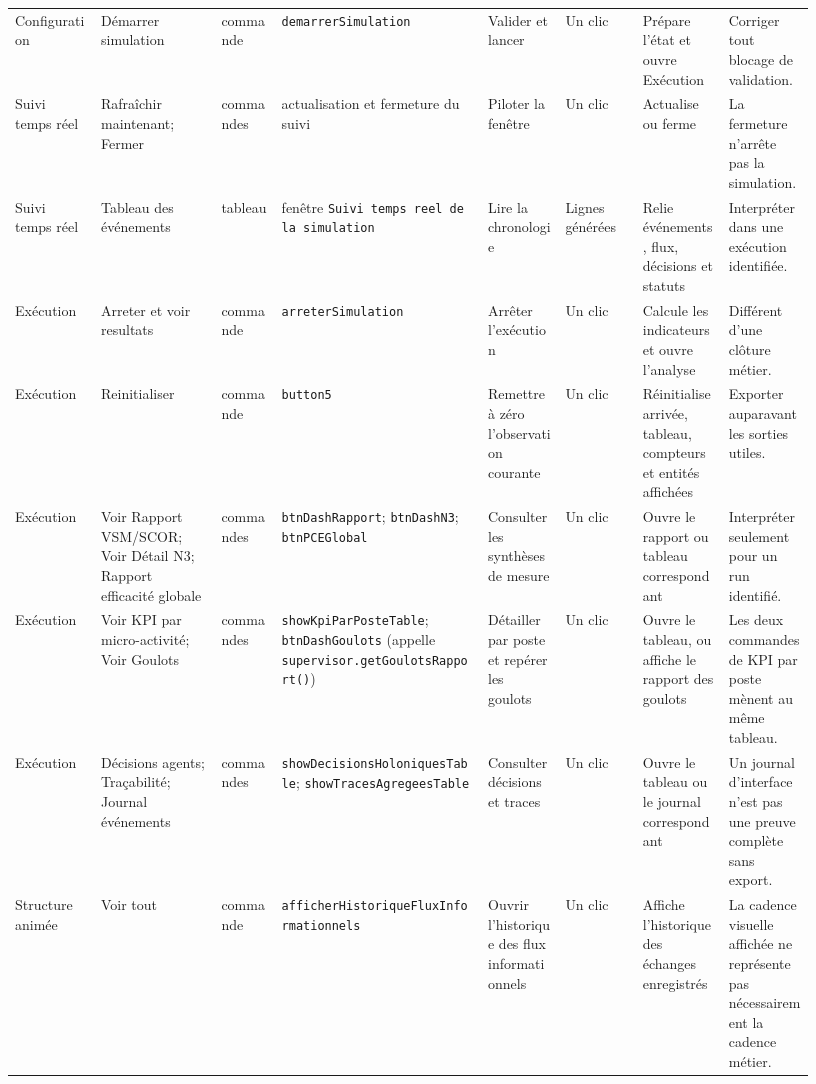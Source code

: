\begin{landscape}
{\begin{longtable}{L{0.10\linewidth} L{0.14\linewidth} L{0.07\linewidth} L{0.24\linewidth} L{0.09\linewidth} L{0.09\linewidth} L{0.10\linewidth} L{0.10\linewidth}}
Configuration & Démarrer simulation & commande & \texttt{demarrerSimulation} & Valider et lancer & Un clic & Prépare l'état et ouvre Exécution & Corriger tout blocage de validation. \\
Suivi temps réel & Rafraîchir maintenant; Fermer & commandes & actualisation et fermeture du suivi & Piloter la fenêtre & Un clic & Actualise ou ferme & La fermeture n'arrête pas la simulation. \\
Suivi temps réel & Tableau des événements & tableau & fenêtre \texttt{Suivi temps reel de la simulation} & Lire la chronologie & Lignes générées & Relie événements, flux, décisions et statuts & Interpréter dans une exécution identifiée. \\
Exécution & Arreter et voir resultats & commande & \texttt{arreterSimulation} & Arrêter l'exécution & Un clic & Calcule les indicateurs et ouvre l'analyse & Différent d'une clôture métier. \\
Exécution & Reinitialiser & commande & \texttt{button5} & Remettre à zéro l'observation courante & Un clic & Réinitialise arrivée, tableau, compteurs et entités affichées & Exporter auparavant les sorties utiles. \\
Exécution & Voir Rapport VSM/SCOR; Voir Détail N3; Rapport efficacité globale & commandes & \texttt{btnDashRapport}; \texttt{btnDashN3}; \texttt{btnPCEGlobal} & Consulter les synthèses de mesure & Un clic & Ouvre le rapport ou tableau correspondant & Interpréter seulement pour un run identifié. \\
Exécution & Voir KPI par micro-activité; Voir Goulots & commandes & \texttt{showKpiParPosteTable}; \texttt{btnDashGoulots} (appelle \texttt{supervisor.\allowbreak getGoulotsRapport()}) & Détailler par poste et repérer les goulots & Un clic & Ouvre le tableau, ou affiche le rapport des goulots & Les deux commandes de KPI par poste mènent au même tableau. \\
Exécution & Décisions agents; Traçabilité; Journal événements & commandes & \texttt{showDecisionsHoloniquesTable}; \texttt{showTracesAgregeesTable} & Consulter décisions et traces & Un clic & Ouvre le tableau ou le journal correspondant & Un journal d'interface n'est pas une preuve complète sans export. \\
Structure animée & Voir tout & commande & \texttt{afficherHistorique\allowbreak FluxInformationnels} & Ouvrir l'historique des flux informationnels & Un clic & Affiche l'historique des échanges enregistrés & La cadence visuelle affichée ne représente pas nécessairement la cadence métier. \\
\end{longtable}
}
\end{landscape}
